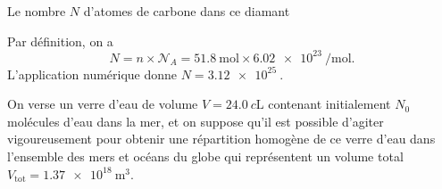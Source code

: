


\begin{enonce}
Le nombre $N$ d'atomes de carbone dans ce diamant
\end{enonce}


\begin{corrige}
Par définition, on a 
\[
N=n\times\mathcal{N}_A=\SI{51,8}{\mole}\times\SI{6,02e23}{\per\mol}.
\]
L'application numérique donne $N=\SI{3,12e25}{}$.
\end{corrige}


\finEntrainement

\minusMedskip







\hauteurLargeurCadreReponse		{7mm}{4cm}
\typeEntrainement				{} %
\initialisationEntrainement


\debutEntrainement

On verse un verre d’eau de volume $V=\SI{24,0}{c\liter}$ contenant initialement $N_0$ molécules d'eau dans la mer, et on suppose qu’il est possible d’agiter vigoureusement pour obtenir une répartition homogène de ce verre d’eau dans l’ensemble des mers et océans du globe qui représentent un volume total $V_{\text{tot}}=\SI{1,37e18}{\cubic\meter}$.

